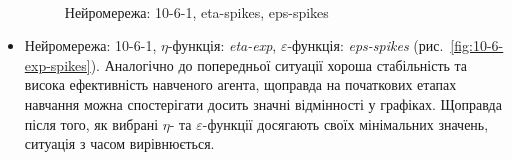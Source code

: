 \documentclass[a4paper,10pt,fleqn]{article}
\begin{document}
\begin{itemize}
\begin{figure}[h!]
  \centering
  \,
  \,
  \caption{Нейромережа: 10-6-1, eta-spikes, eps-spikes}
  \label{fig:10-6-spikes-spikes}
\end{figure}

\item Нейромережа: 10-6-1, $\eta$-функція: \textit{eta-exp}, $\varepsilon$-функція: \textit{eps-spikes} (рис.~\ref{fig:10-6-exp-spikes}). Аналогічно до попередньої ситуації хороша стабільність та висока ефективність навченого агента, щоправда на початкових етапах навчання можна спостерігати досить значні відмінності у графіках. Щоправда після того, як вибрані $\eta$- та $\varepsilon$-функції досягають своїх мінімальних значень, ситуація з часом вирівнюється.


\end{itemize}
\end{document}
